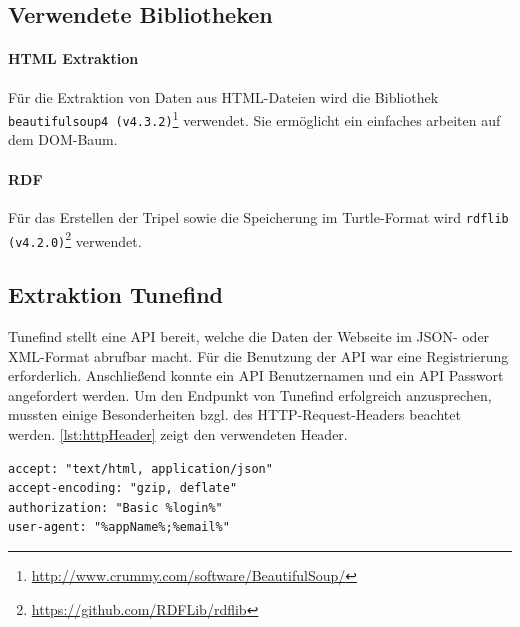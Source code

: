 \documentclass[parskip]{scrartcl}
\begin{document}
\subsection{Verwendete Bibliotheken}

\paragraph{HTML Extraktion}
Für die Extraktion von Daten aus HTML-Dateien wird die Bibliothek \texttt{beautifulsoup4  (v4.3.2)}\footnote{\href{http://www.crummy.com/software/BeautifulSoup/}{http://www.crummy.com/software/BeautifulSoup/}} verwendet. Sie ermöglicht ein einfaches arbeiten auf dem DOM-Baum.

\paragraph{RDF}
Für das Erstellen der Tripel sowie die Speicherung im Turtle-Format wird \texttt{rdflib (v4.2.0)}\footnote{\href{https://github.com/RDFLib/rdflib}{https://github.com/RDFLib/rdflib}} verwendet. 

\subsection{Extraktion Tunefind}

Tunefind stellt eine API bereit, welche die Daten der Webseite im JSON- oder XML-Format abrufbar macht. Für die Benutzung der API war eine Registrierung erforderlich. Anschließend konnte ein API Benutzernamen und ein API Passwort angefordert werden.
Um den Endpunkt von Tunefind erfolgreich anzusprechen, mussten einige Besonderheiten bzgl. des HTTP-Request-Headers beachtet werden. \autoref{lst:httpHeader} zeigt den verwendeten Header.

\begin{lstlisting}[caption={HTTP-Request-Header}, label={lst:httpHeader}]
accept: "text/html, application/json"
accept-encoding: "gzip, deflate"
authorization: "Basic %login%"
user-agent: "%appName%;%email%"
\end{lstlisting}
\end{document}
